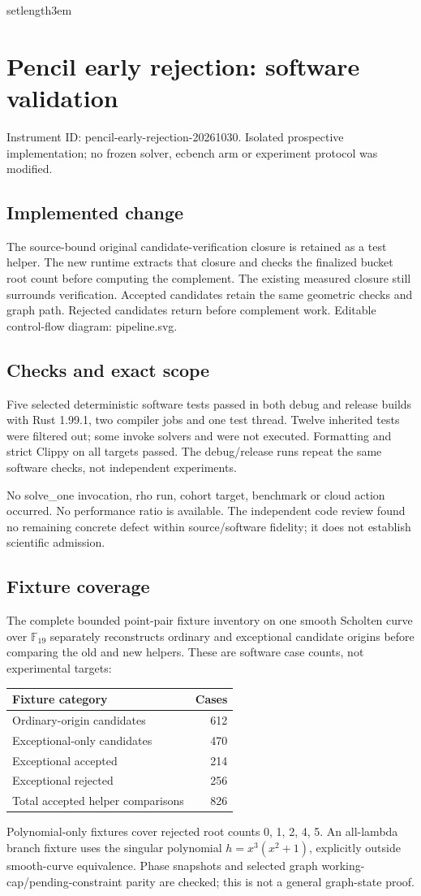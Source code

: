\documentclass[11pt]{article}
\begin{document}
setlength{\emergencystretch}{3em}
\section*{Pencil early rejection: software validation}
Instrument ID: pencil-early-rejection-20261030. Isolated prospective implementation; no frozen solver, ecbench arm or experiment protocol was modified.
\subsection*{Implemented change}
The source-bound original candidate-verification closure is retained as a test helper. The new runtime extracts that closure and checks the finalized bucket root count before computing the complement. The existing measured closure still surrounds verification. Accepted candidates retain the same geometric checks and graph path. Rejected candidates return before complement work. Editable control-flow diagram: pipeline.svg.
\subsection*{Checks and exact scope}
Five selected deterministic software tests passed in both debug and release builds with Rust 1.99.1, two compiler jobs and one test thread. Twelve inherited tests were filtered out; some invoke solvers and were not executed. Formatting and strict Clippy on all targets passed. The debug/release runs repeat the same software checks, not independent experiments.\par
No solve\_one invocation, rho run, cohort target, benchmark or cloud action occurred. No performance ratio is available. The independent code review found no remaining concrete defect within source/software fidelity; it does not establish scientific admission.
\subsection*{Fixture coverage}
The complete bounded point-pair fixture inventory on one smooth Scholten curve over $\mathbb F_{19}$ separately reconstructs ordinary and exceptional candidate origins before comparing the old and new helpers. These are software case counts, not experimental targets:
\begin{center}\begin{tabular}{lr}\toprule
Fixture category&Cases\\\midrule
Ordinary-origin candidates&612\\
Exceptional-only candidates&470\\
Exceptional accepted&214\\
Exceptional rejected&256\\
Total accepted helper comparisons&826\\\bottomrule\end{tabular}\end{center}
Polynomial-only fixtures cover rejected root counts 0, 1, 2, 4, 5. An all-lambda branch fixture uses the singular polynomial $h=x^3(x^2+1)$, explicitly outside smooth-curve equivalence. Phase snapshots and selected graph working-cap/pending-constraint parity are checked; this is not a general graph-state proof.
\end{document}
